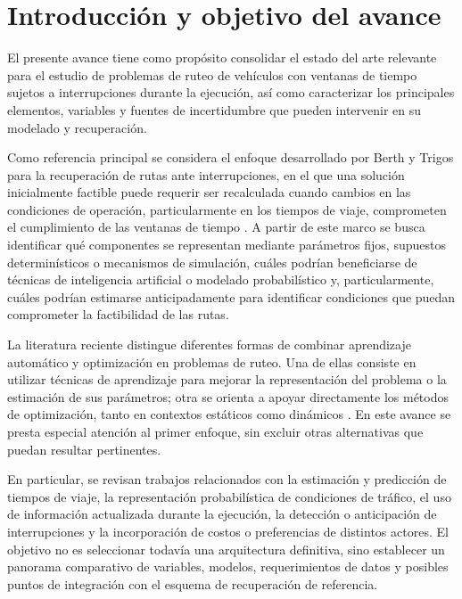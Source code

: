 \documentclass[11pt]{article}
\begin{document}
\tableofcontents
\newpage

\section{Introducción y objetivo del avance}

El presente avance tiene como propósito consolidar el estado del arte relevante para el estudio de problemas de ruteo de vehículos con ventanas de tiempo sujetos a interrupciones durante la ejecución, así como caracterizar los principales elementos, variables y fuentes de incertidumbre que pueden intervenir en su modelado y recuperación.

Como referencia principal se considera el enfoque desarrollado por Berth y Trigos para la recuperación de rutas ante interrupciones, en el que una solución inicialmente factible puede requerir ser recalculada cuando cambios en las condiciones de operación, particularmente en los tiempos de viaje, comprometen el cumplimiento de las ventanas de tiempo \parencite{berth_trigos_2025,berth_thesis_2025}. A partir de este marco se busca identificar qué componentes se representan mediante parámetros fijos, supuestos determinísticos o mecanismos de simulación, cuáles podrían beneficiarse de técnicas de inteligencia artificial o modelado probabilístico y, particularmente, cuáles podrían estimarse anticipadamente para identificar condiciones que puedan comprometer la factibilidad de las rutas.

La literatura reciente distingue diferentes formas de combinar aprendizaje automático y optimización en problemas de ruteo. Una de ellas consiste en utilizar técnicas de aprendizaje para mejorar la representación del problema o la estimación de sus parámetros; otra se orienta a apoyar directamente los métodos de optimización, tanto en contextos estáticos como dinámicos \parencite{bai_et_al_2023}. En este avance se presta especial atención al primer enfoque, sin excluir otras alternativas que puedan resultar pertinentes.

En particular, se revisan trabajos relacionados con la estimación y predicción de tiempos de viaje, la representación probabilística de condiciones de tráfico, el uso de información actualizada durante la ejecución, la detección o anticipación de interrupciones y la incorporación de costos o preferencias de distintos actores. El objetivo no es seleccionar todavía una arquitectura definitiva, sino establecer un panorama comparativo de variables, modelos, requerimientos de datos y posibles puntos de integración con el esquema de recuperación de referencia.
\end{document}
